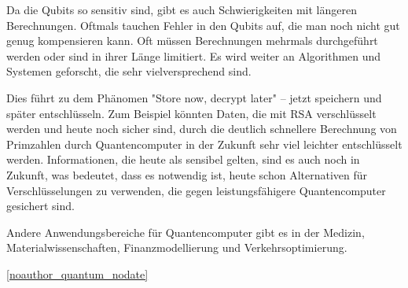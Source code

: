 Da die Qubits so sensitiv sind, gibt es auch Schwierigkeiten mit längeren Berechnungen. Oftmals tauchen Fehler in den Qubits auf, die man noch nicht gut genug kompensieren kann. Oft müssen Berechnungen mehrmals durchgeführt werden oder sind in ihrer Länge limitiert.\cite{brubaker_quantum_2024} Es wird weiter an Algorithmen und Systemen geforscht, die sehr vielversprechend sind.

Dies führt zu dem Phänomen "Store now, decrypt later" – jetzt speichern und später entschlüsseln. Zum Beispiel könnten Daten, die mit RSA verschlüsselt werden und heute noch sicher sind, durch die deutlich schnellere Berechnung von Primzahlen durch Quantencomputer in der Zukunft sehr viel leichter entschlüsselt werden. 
Informationen, die heute als sensibel gelten, sind es auch noch in Zukunft, was bedeutet, dass es notwendig ist, heute schon Alternativen für Verschlüsselungen zu verwenden, die gegen leistungsfähigere Quantencomputer gesichert sind.\cite{veritasium_how_2023}

Andere Anwendungsbereiche für Quantencomputer gibt es in der Medizin, 
Materialwissenschaften, Finanzmodellierung 
und Verkehrsoptimierung. \cite{Applications_10_nodate}


\ref{noauthor_quantum_nodate}